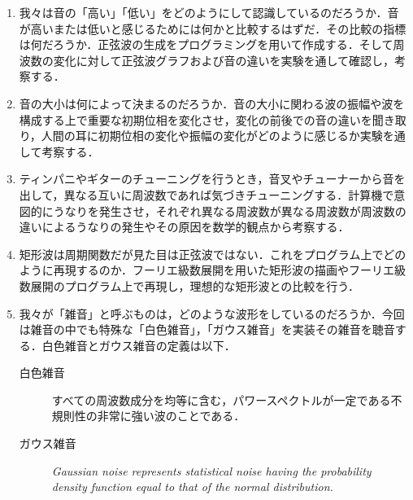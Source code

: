 \begin{enumerate}
	\item 我々は音の「高い」「低い」をどのようにして認識しているのだろうか．音が高いまたは低いと感じるためには何かと比較するはずだ．その比較の指標は何だろうか．正弦波の生成をプログラミングを用いて作成する．そして周波数の変化に対して正弦波グラフおよび音の違いを実験を通して確認し，考察する．
	\item 音の大小は何によって決まるのだろうか．音の大小に関わる波の振幅や波を構成する上で重要な初期位相を変化させ，変化の前後での音の違いを聞き取り，人間の耳に初期位相の変化や振幅の変化がどのように感じるか実験を通して考察する．
	\item ティンパニやギターのチューニングを行うとき，音叉やチューナーから音を出して，異なる互いに周波数であれば気づきチューニングする．計算機で意図的にうなりを発生させ，それぞれ異なる周波数が異なる周波数が周波数の違いによるうなりの発生やその原因を数学的観点から考察する．
	\item 矩形波は周期関数だが見た目は正弦波ではない．これをプログラム上でどのように再現するのか．フーリエ級数展開を用いた矩形波の描画やフーリエ級数展開のプログラム上で再現し，理想的な矩形波との比較を行う．
	\item 我々が「雑音」と呼ぶものは，どのような波形をしているのだろうか．今回は雑音の中でも特殊な「白色雑音」，「ガウス雑音」を実装その雑音を聴音する．白色雑音とガウス雑音の定義は以下．
	      \begin{description}
		      \item[白色雑音] すべての周波数成分を均等に含む，パワースペクトルが一定である不規則性の非常に強い波のことである．\cite{whitenoise}
		      \item[ガウス雑音] \textit{Gaussian noise represents statistical noise having the probability density function equal to that of the normal distribution.}
	      \end{description}
\end{enumerate}